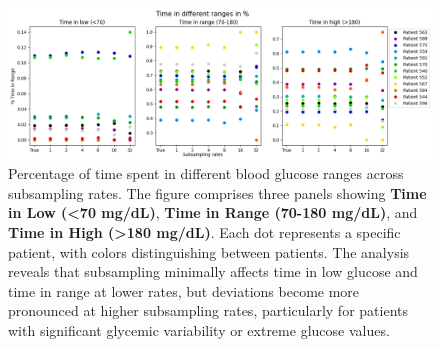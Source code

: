 \begin{figure}[ht] %
	\centering
	\includegraphics[width=\linewidth]{Figures/all_patients_time_in_full_range.png} %
	\caption{Percentage of time spent in different blood glucose ranges across subsampling rates. The figure comprises three panels showing \textbf{Time in Low (<70 mg/dL)}, \textbf{Time in Range (70-180 mg/dL)}, and \textbf{Time in High (>180 mg/dL)}. Each dot represents a specific patient, with colors distinguishing between patients. The analysis reveals that subsampling minimally affects time in low glucose and time in range at lower rates, but deviations become more pronounced at higher subsampling rates, particularly for patients with significant glycemic variability or extreme glucose values.}
	\label{fig:time_in_ranges}  %
\end{figure}


